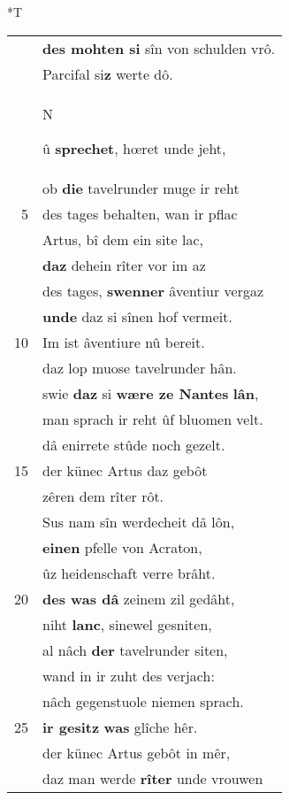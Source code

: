 \documentclass[8pt,a4paper,notitlepage]{article}
\begin{document}
\begin{table}[ht]
\begin{minipage}[t]{0.5\linewidth}
\end{minipage}
\hspace{0.5cm}
\begin{minipage}[t]{0.5\linewidth}
\small
\begin{center}*T
\end{center}
\begin{tabular}{rl}
 & \textbf{des mohten si} sîn von schulden vrô.\\ 
 & Parcifal si\textbf{z} werte dô.\\ 
 & \begin{large}N\end{large}û \textbf{sprechet}, hœret unde jeht,\\ 
 & ob \textbf{die} tavelrunder muge ir reht\\ 
5 & des tages behalten, wan ir pflac\\ 
 & Artus, bî dem ein site lac,\\ 
 & \textbf{daz} dehein rîter vor im az\\ 
 & des tages, \textbf{swenne}\textbf{r} âventiur vergaz\\ 
 & \textbf{unde} daz si sînen hof vermeit.\\ 
10 & Im ist âventiure nû bereit.\\ 
 & daz lop muose tavelrunder hân.\\ 
 & swie \textbf{daz} si \textbf{wære ze Nantes} \textbf{lân},\\ 
 & man sprach ir reht ûf bluomen velt.\\ 
 & dâ enirrete stûde noch gezelt.\\ 
15 & der künec Artus daz gebôt\\ 
 & zêren dem rîter rôt.\\ 
 & Sus nam sîn werdecheit dâ lôn,\\ 
 & \textbf{einen} pfelle von Acraton,\\ 
 & ûz heidenschaft verre brâht.\\ 
20 & \textbf{des was dâ} zeinem zil gedâht,\\ 
 & niht \textbf{lanc}, sinewel gesniten,\\ 
 & al nâch \textbf{der} tavelrunder siten,\\ 
 & wand in ir zuht des verjach:\\ 
 & nâch gegenstuole niemen sprach.\\ 
25 & \textbf{ir gesitz} \textbf{was} glîche hêr.\\ 
 & der künec Artus gebôt in mêr,\\ 
 & daz man werde \textbf{rîter} unde vrouwen\\ 

\end{tabular}
\end{minipage}
\end{table}
\end{document}
